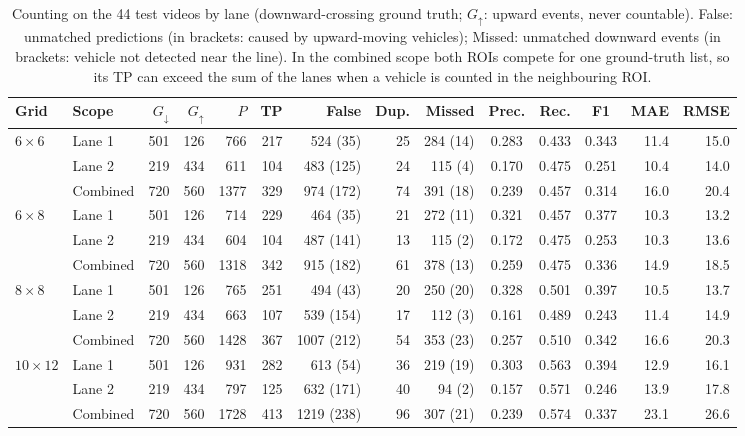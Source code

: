 \begin{table}[t]
\centering
\caption{Counting on the 44 test videos by lane (downward-crossing ground truth; $G_{\uparrow}$:
upward events, never countable). False: unmatched predictions (in brackets: caused by
upward-moving vehicles); Missed: unmatched downward events (in brackets: vehicle not detected
near the line). In the combined scope both ROIs compete for one ground-truth list, so its
TP can exceed the sum of the lanes when a vehicle is counted in the neighbouring ROI.}
\label{tab:count}
\scriptsize
\setlength{\tabcolsep}{3.4pt}
\begin{tabular}{llrrrrrrrcccrr}
\toprule
\textbf{Grid} & \textbf{Scope} & $G_{\downarrow}$ & $G_{\uparrow}$ & $P$ & \textbf{TP} & \textbf{False} & \textbf{Dup.} & \textbf{Missed} & \textbf{Prec.} & \textbf{Rec.} & \textbf{F1} & \textbf{MAE} & \textbf{RMSE}\\
\midrule
$6{\times}6$ & Lane 1 & 501 & 126 & 766 & 217 & 524 (35) & 25 & 284 (14) & 0.283 & 0.433 & 0.343 & 11.4 & 15.0\\
 & Lane 2 & 219 & 434 & 611 & 104 & 483 (125) & 24 & 115 (4) & 0.170 & 0.475 & 0.251 & 10.4 & 14.0\\
 & Combined & 720 & 560 & 1377 & 329 & 974 (172) & 74 & 391 (18) & 0.239 & 0.457 & 0.314 & 16.0 & 20.4\\
\midrule
$6{\times}8$ & Lane 1 & 501 & 126 & 714 & 229 & 464 (35) & 21 & 272 (11) & 0.321 & 0.457 & 0.377 & 10.3 & 13.2\\
 & Lane 2 & 219 & 434 & 604 & 104 & 487 (141) & 13 & 115 (2) & 0.172 & 0.475 & 0.253 & 10.3 & 13.6\\
 & Combined & 720 & 560 & 1318 & 342 & 915 (182) & 61 & 378 (13) & 0.259 & 0.475 & 0.336 & 14.9 & 18.5\\
\midrule
$8{\times}8$ & Lane 1 & 501 & 126 & 765 & 251 & 494 (43) & 20 & 250 (20) & 0.328 & 0.501 & 0.397 & 10.5 & 13.7\\
 & Lane 2 & 219 & 434 & 663 & 107 & 539 (154) & 17 & 112 (3) & 0.161 & 0.489 & 0.243 & 11.4 & 14.9\\
 & Combined & 720 & 560 & 1428 & 367 & 1007 (212) & 54 & 353 (23) & 0.257 & 0.510 & 0.342 & 16.6 & 20.3\\
\midrule
$10{\times}12$ & Lane 1 & 501 & 126 & 931 & 282 & 613 (54) & 36 & 219 (19) & 0.303 & 0.563 & 0.394 & 12.9 & 16.1\\
 & Lane 2 & 219 & 434 & 797 & 125 & 632 (171) & 40 & 94 (2) & 0.157 & 0.571 & 0.246 & 13.9 & 17.8\\
 & Combined & 720 & 560 & 1728 & 413 & 1219 (238) & 96 & 307 (21) & 0.239 & 0.574 & 0.337 & 23.1 & 26.6\\
\bottomrule
\end{tabular}
\end{table}

